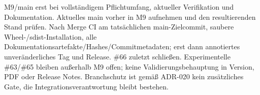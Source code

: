 M9/main erst bei vollständigem Pflichtumfang, aktueller Verifikation und
Dokumentation. Aktuelles main vorher in M9 aufnehmen und den resultierenden
Stand prüfen. Nach Merge CI am tatsächlichen main-Zielcommit, saubere
Wheel-/sdist-Installation, alle Dokumentationsartefakte/Hashes/Commitmetadaten;
erst dann annotiertes unveränderliches Tag und Release. \#66 zuletzt schließen.
Experimentelle \#63/\#65 bleiben außerhalb M9 offen; keine Validierungsbehauptung
in Version, PDF oder Release Notes. Branchschutz ist gemäß ADR-020 kein
zusätzliches Gate, die Integrationsverantwortung bleibt bestehen.
\endgroup
